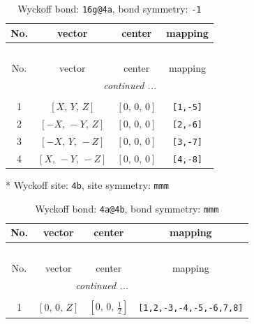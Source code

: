 \documentclass[fleqn,8pt]{jsarticle}
\begin{document}
\begin{longtable}{cccc}
\caption{Wyckoff bond: {\tt 16g@4a}, bond symmetry: {\tt -1}}
 \\
 \hline \hline
No. & vector & center & mapping \\ \hline \endfirsthead

\multicolumn{3}{l}{\tablename\ \thetable{}} \\
 \hline \hline
No. & vector & center & mapping \\ \hline \endhead

 \hline \hline
\multicolumn{3}{r}{\footnotesize\it continued ...} \\ \endfoot

 \hline \hline
\multicolumn{3}{r}{} \\ \endlastfoot

1 & $\left[ X,\, Y,\, Z \right]$ & $\left[ 0,\, 0,\, 0 \right]$ & {\tt [1,-5]} \\ \hline
2 & $\left[ - X,\, - Y,\, Z \right]$ & $\left[ 0,\, 0,\, 0 \right]$ & {\tt [2,-6]} \\ \hline
3 & $\left[ - X,\, Y,\, - Z \right]$ & $\left[ 0,\, 0,\, 0 \right]$ & {\tt [3,-7]} \\ \hline
4 & $\left[ X,\, - Y,\, - Z \right]$ & $\left[ 0,\, 0,\, 0 \right]$ & {\tt [4,-8]} \\
\end{longtable}
* Wyckoff site: {\tt 4b}, site symmetry: {\tt mmm}
\renewcommand{\arraystretch}{1.2}
\begin{longtable}{cccc}
\caption{Wyckoff bond: {\tt 4a@4b}, bond symmetry: {\tt mmm}}
 \\
 \hline \hline
No. & vector & center & mapping \\ \hline \endfirsthead

\multicolumn{3}{l}{\tablename\ \thetable{}} \\
 \hline \hline
No. & vector & center & mapping \\ \hline \endhead

 \hline \hline
\multicolumn{3}{r}{\footnotesize\it continued ...} \\ \endfoot

 \hline \hline
\multicolumn{3}{r}{} \\ \endlastfoot

1 & $\left[ 0,\, 0,\, Z \right]$ & $\left[ 0,\, 0,\, \frac{1}{2} \right]$ & {\tt [1,2,-3,-4,-5,-6,7,8]} \\
\end{longtable}
\renewcommand{\arraystretch}{1.2}
\end{document}

